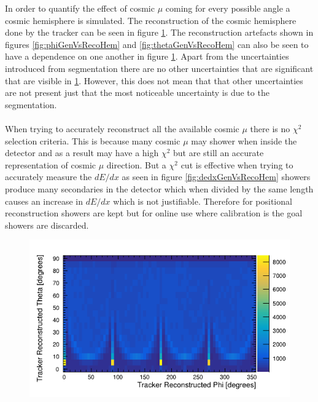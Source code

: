 In order to quantify the effect of cosmic $\mu$ coming for every possible angle a cosmic hemisphere is simulated. The reconstruction of the cosmic hemisphere done by the tracker can be seen in figure \ref{fig:simulatedHemisphereDist}. The reconstruction artefacts shown in figures \ref{fig:phiGenVsRecoHem} and \ref{fig:thetaGenVsRecoHem} can also be seen to have a dependence on one another in figure \ref{fig:simulatedHemisphereDist}. Apart from the uncertainties introduced from segmentation there are no other uncertainties that are significant that are visible in \ref{fig:simulatedHemisphereDist}. However, this does not mean that that other uncertainties are not present just that the most noticeable uncertainty is due to the segmentation. 
\\\\ When trying to accurately reconstruct all the available cosmic $\mu$ there is no $\chi^2$ selection criteria. This is because many cosmic $\mu$ may shower when inside the detector and as a result may have a high $\chi^2$ but are still an accurate representation of cosmic $\mu$ direction. But a $\chi^2$ cut is effective when trying to accurately measure the $dE/dx$ as seen in figure \ref{fig:dedxGenVsRecoHem} showers produce many secondaries in the detector which when divided by the same length causes an increase in $dE/dx$ which is not justifiable. Therefore for positional reconstruction showers are kept but for online use where calibration is the goal showers are discarded.

\begin{figure}[H]
 \centering
 \includegraphics[width=0.8\linewidth]{Chapter5/Figs/Raster/phi_vs_theta_hem_simNoDead.png}
 \label{fig:simulatedHemisphereDist}
\end{figure}

